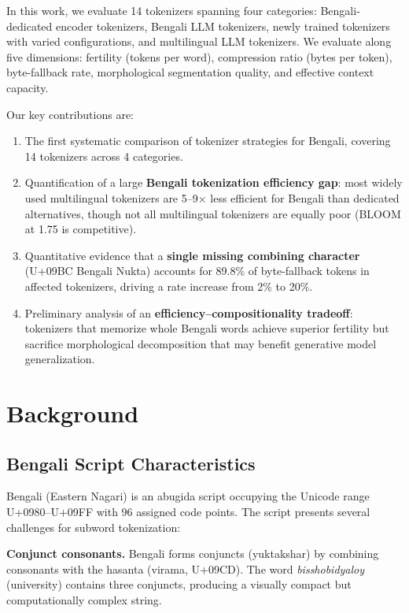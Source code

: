 \documentclass[11pt,a4paper]{article}
\begin{document}
In this work, we evaluate 14 tokenizers spanning four categories: Bengali-dedicated encoder tokenizers, Bengali LLM tokenizers, newly trained tokenizers with varied configurations, and multilingual LLM tokenizers.
We evaluate along five dimensions: fertility (tokens per word), compression ratio (bytes per token), byte-fallback rate, morphological segmentation quality, and effective context capacity.

Our key contributions are:
\begin{enumerate}
    \item The first systematic comparison of tokenizer strategies for Bengali, covering 14 tokenizers across 4 categories.
    \item Quantification of a large \textbf{Bengali tokenization efficiency gap}: most widely used multilingual tokenizers are 5--9$\times$ less efficient for Bengali than dedicated alternatives, though not all multilingual tokenizers are equally poor (BLOOM at 1.75 is competitive).
    \item Quantitative evidence that a \textbf{single missing combining character} (U+09BC Bengali Nukta) accounts for 89.8\% of byte-fallback tokens in affected tokenizers, driving a rate increase from 2\% to 20\%.
    \item Preliminary analysis of an \textbf{efficiency--compositionality tradeoff}: tokenizers that memorize whole Bengali words achieve superior fertility but sacrifice morphological decomposition that may benefit generative model generalization.
\end{enumerate}

\section{Background}

\subsection{Bengali Script Characteristics}

Bengali (Eastern Nagari) is an abugida script occupying the Unicode range U+0980--U+09FF with 96 assigned code points.
The script presents several challenges for subword tokenization:

\textbf{Conjunct consonants.} Bengali forms conjuncts (yuktakshar) by combining consonants with the hasanta (virama, U+09CD). The word \textit{bisshobidyaloy} (university) contains three conjuncts, producing a visually compact but computationally complex string.
\end{document}
